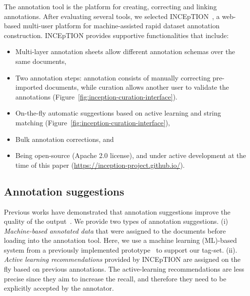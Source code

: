 The annotation tool is the platform for creating, correcting and linking annotations.
After evaluating several tools, we selected INCEpTION~\cite{tubiblio106270,eckart-de-castilho-etal-2016-web}, a web-based multi-user platform for machine-assisted rapid dataset annotation construction. 
INCEpTION provides supportive functionalities that include: 
\begin{itemize}
    \item Multi-layer annotation sheets allow different annotation schemas over the same documents, 
    \item Two annotation steps: annotation consists of manually correcting pre-imported documents, while curation allows another user to validate the annotations (Figure~\ref{fig:inception-curation-interface}). 
    \item On-the-fly automatic suggestions based on active learning and string matching (Figure~\ref{fig:inception-curation-interface}), 
    \item Bulk annotation corrections, and 
    \item Being open-source (Apache 2.0 license), and under active development at the time of this paper (\url{https://inception-project.github.io/}).
\end{itemize}

\subsection{Annotation suggestions}
\label{subsec:automatic-system-prototype}

Previous works have demonstrated that annotation suggestions improve the quality of the output~\cite{Fort2010InfluenceOP, Nvol2011SemiautomaticSA, Lingren2014EvaluatingTI}.
We provide two types of annotation suggestions. 
(i) \textit{Machine-based annotated data} that were assigned to the documents before loading into the annotation tool. Here, we use a machine learning (ML)-based system from a previously implemented prototype~\cite{foppiano2019proposal} to support our tag-set. 
(ii). \textit{Active learning recommendations} provided by INCEpTION are assigned on the fly based on previous annotations. 
The active-learning recommendations are less precise since they aim to increase the recall, and therefore they need to be explicitly accepted by the annotator.


